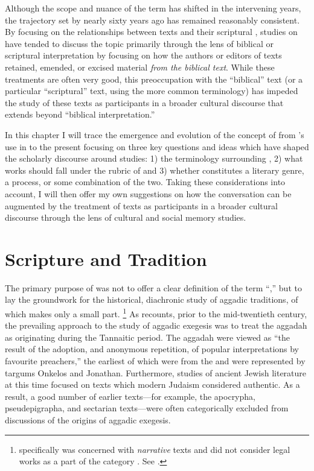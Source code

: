 Although the scope and nuance of the term \rwb has shifted in the intervening years, the trajectory set by \vermes nearly sixty years ago has remained reasonably consistent. By focusing on the relationships between \rwb texts and their scriptural \vorlagen, studies on \rwb have tended to discuss the topic primarily through the lens of biblical or scriptural interpretation by focusing on how the authors or editors of \rwb texts retained, emended, or excised material \emph{from the biblical text}. While these treatments are often very good, this preoccupation with the ``biblical'' text (or a particular ``scriptural'' text, using the more common terminology) has impeded the study of these texts as participants in a broader cultural discourse that extends beyond ``biblical interpretation.''

In this chapter I will trace the emergence and evolution of the concept of \rwb from \vermes's use in  to the present focusing on three key questions and ideas which have shaped the scholarly discourse around \rwb studies: 1) the terminology surrounding \rwb, 2) what works should fall under the rubric of \rwb and 3) whether \rwb constitutes a literary genre, a process, or some combination of the two. Taking these considerations into account, I will then offer my own suggestions on how the \rwb conversation can be augmented by the treatment of \rwb texts as participants in a broader cultural discourse through the lens of cultural and social memory studies.

\section{Scripture and Tradition}

The primary purpose of  was not to offer a clear definition of the term ``\rwb,'' but to lay the groundwork for the historical, diachronic study of aggadic traditions, of which \rwb makes only a small part.%
    \footnote{%
        \vermes specifically was concerned with \emph{narrative} texts and did not consider legal works as a part of the category \rwb. See 
        \cite[3]{vermes_zsengeller2014}.}
As \vermes recounts, prior to the mid-twentieth century, the prevailing approach to the study of aggadic exegesis was to treat the aggadah as originating during the Tannaitic period. The aggadah were viewed as ``the result of the adoption, and anonymous repetition, of popular interpretations by favourite preachers,''%
    \autocite[3]{vermes1961}
the earliest of which were from the  and were represented by targums Onkelos and Jonathan. Furthermore, studies of ancient Jewish literature at this time focused on texts which modern Judaism considered authentic. As a result, a good number of earlier texts---for example, the apocrypha, pseudepigrapha, and sectarian texts---were often categorically excluded from discussions of the origins of aggadic exegesis.%
    \autocite[2]{vermes1961} 

